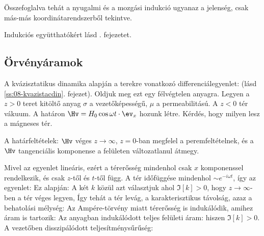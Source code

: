   Összefoglalva tehát a nyugalmi és a mozgási indukció ugyanaz a jelenség, csak más-más koordinátarendszerből tekintve.
  
  Indukciós együtthatókért lásd . fejezetet.

  \subsection{Örvényáramok}
   
   A kvázisztatikus dinamika alapján a terekre vonatkozó differenciálegyenlet:
   (lásd \ref{ss:08-kvazistacdin}. fejezet).
   Oldjuk meg ezt egy félvégtelen anyagra.
   Legyen a $z>0$ teret kitöltő anyag $\sigma$ a vezetőképességű, $\mu$ a permeabilitású.
   A $z<0$ tér vákuum.
   A határon $\Hv=H_0\cos\omega t\cdot \ev_x$ hozunk létre.
   Kérdés, hogy milyen lesz a mágneses tér. 
   
   A határfeltételek: $\Hv$ véges $z\to\infty$, $z=0$-ban megfelel a peremfeltételnek, és a $\Hv$ tangenciális komponense a felületen változatlanul átmegy. 
   
   Mivel az egyenlet lineáris, ezért a térerősség mindenhol csak $x$ komponenssel rendelkezik, és csak $z$-től és $t$-től függ.
   A tér időfüggése mindenhol $\sim e^{-i\omega t}$, így az egyenlet:
   Ez alapján:
   A két $k$ közül azt választjuk ahol $\Im[k]>0$, hogy $z\to\infty$-ben a tér véges legyen, Így tehát a tér levág, a karakterisztikus távolság, azaz a behatolási mélység:
   Az Ampére-törvény miatt térerősség is indukálódik, amihez áram is tartozik:
   Az anyagban indukálódott teljes felületi áram:
   hiszen $\Im[k]>0$.
   A vezetőben disszipálódott teljesítménysűrűség:
